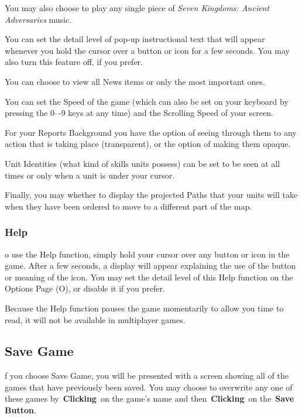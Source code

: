You may also choose to play any single piece of \textit{Seven Kingdoms: Ancient Adversaries} music.

You can set the detail level of pop-up instructional text that will appear whenever you hold the cursor over a button or icon for a few seconds. You may also turn this feature off, if you prefer.

You can choose to view all News items or only the most important ones.

You can set the Speed of the game (which can also be set on your keyboard by pressing the 0–-9 keys at any time) and the Scrolling Speed of your screen.

For your Reports Background you have the option of seeing through them to any action that is taking place (transparent), or the option of making them opaque.

Unit Identities (what kind of skills units possess) can be set to be seen at all times or only when a unit is under your cursor.

Finally, you may whether to display the projected Paths that your units will take when they have been ordered to move to a different part of the map.

\subsubsection{Help}

o use the Help function, simply hold your cursor over any button or icon in the game. After a few seconds, a display will appear explaining the use of the button or meaning of the icon. You may set the detail level of this Help function on the Options Page (O), or disable it if you prefer.

Because the Help function pauses the game momentarily to allow you time to read, it will not be available in multiplayer games.

\subsection{Save Game}


f you choose Save Game, you will be presented with a screen showing all of the games that have previously been saved. You may choose to overwrite any one of these games by \textbf{Clicking} on the game’s name and then \textbf{Clicking} on the \textbf{Save Button}.

